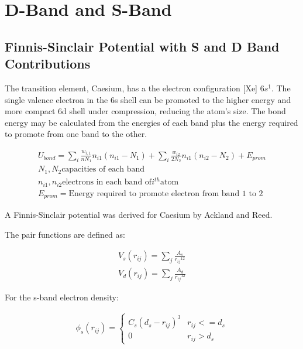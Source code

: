 \documentclass[12pt,twoside]{manual}
\begin{document}
\section{D-Band and S-Band}

\subsection{Finnis-Sinclair Potential with S and D Band Contributions}

The transition element, Caesium, has a the electron configuration [Xe] $6s^1$.  The single valence electron in the 6s shell can be promoted to the higher energy and more compact 6d shell under compression, reducing the atom's size.  The bond energy may be calculated from the energies of each band plus the energy required to promote from one band to the other\cite{twobandacklandreed}.


\begin{equation}
\begin{split}
U_{bond} = \sum_{i} \frac{w_{i,1}}{nN_1} n_{i1}(n_{i1}-N_1) + \sum_{i} \frac{w_{i2}}{2N_2} n_{i1} (n_{i2} - N_{2}) + E_{prom} \\
N_1, N_2 \text{capacities of each band} \\
n_{i1}, n_{i2} \text{electrons in each band of} i^{th} \text{atom} \\
E_{prom} = \text{Energy required to promote electron from band 1 to 2}
\end{split}
\label{eq:eq2BandBondEnergy}
\end{equation}

A Finnis-Sinclair potential was derived for Caesium by Ackland and Reed.

The pair functions are defined as:

\begin{equation}
\begin{split}
V_s (r_{ij}) = \sum_j \frac{A_s}{{r_{ij}}^{12}} \\
V_d (r_{ij}) = \sum_j \frac{A_d}{{r_{ij}}^{12}}
\end{split}
\label{eq:caseiumPairFunction}
\end{equation}


For the s-band electron density:

\begin{equation}
\begin{split}
\phi_{s} (r_{ij}) =%
\begin{cases}
C_s \left(d_s-r_{ij}\right)^3 & r_{ij} <= d_s \\
0 & r_{ij} > d_s
\end{cases}
\end{split}
\label{eq:caesiumDensityS}
\end{equation}
\end{document}
